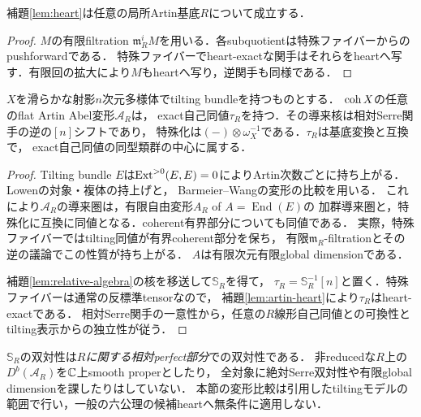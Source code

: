 \begin{lemma}[Artin版のheart判定]\label{lem:artin-heart}
補題\ref{lem:heart}は任意の局所Artin基底$R$について成立する．
\end{lemma}
\begin{proof}
$M$の有限filtration $\mathfrak m_R^iM$を用いる．各subquotientは特殊ファイバーからのpushforwardである．
特殊ファイバーでheart-exactな関手はそれらをheartへ写す．有限回の拡大により$M$もheartへ写り，逆関手も同様である．
\end{proof}

\begin{proposition}[Tilting付き幾何の相対反Serre関手]\label{prop:tilting-serre}
$X$を滑らかな射影$n$次元多様体でtilting bundleを持つものとする．
$\operatorname{coh} X$の任意のflat Artin Abel変形$\mathcal A_R$は，
exact自己同値$\tau_R$を持つ．その導来核は相対Serre関手の逆の$[n]$シフトであり，
特殊化は$(-)\otimes\omega_X^{-1}$である．$\tau_R$は基底変換と互換で，
exact自己同値の同型類群の中心に属する．
\end{proposition}
\begin{proof}
Tilting bundle $E$は$\operatorname{Ext}^{>0}(E,E)=0$によりArtin次数ごとに持ち上がる．
Lowen\cite[Theorems A, B]{LowenOb}の対象・複体の持上げと，
Barmeier--Wang\cite[Theorems 3.1, 3.18, Proposition 3.21]{BW}の変形の比較を用いる．
これにより$\mathcal A_R$の導来圏は，有限自由変形$A_R$ of $A=\operatorname{End}(E)$の
加群導来圏と，特殊化に互換に同値となる．coherent有界部分についても同値である．
実際，特殊ファイバーではtilting同値が有界coherent部分を保ち，
有限$\mathfrak m_R$-filtrationとその逆の議論でこの性質が持ち上がる．
$A$は有限次元有限global dimensionである．

補題\ref{lem:relative-algebra}の核を移送して$\mathbb S_R$を得て，
$\tau_R=\mathbb S_R^{-1}[n]$と置く．特殊ファイバーは通常の反標準tensorなので，
補題\ref{lem:artin-heart}により$\tau_R$はheart-exactである．
相対Serre関手の一意性から，任意の$R$線形自己同値との可換性とtilting表示からの独立性が従う．
\end{proof}

\begin{remark}
$\mathbb S_R$の双対性は\emph{$R$に関する相対perfect部分}での双対性である．
非reducedな$R$上の$D^b(\mathcal A_R)$を$\mathbb C$上smooth properとしたり，
全対象に絶対Serre双対性や有限global dimensionを課したりはしていない．
本節の変形比較は引用したtiltingモデルの範囲で行い，一般の六公理の候補heartへ無条件に適用しない．
\end{remark}

